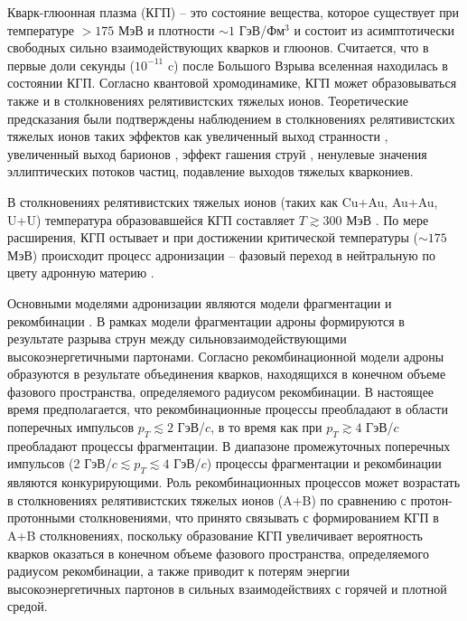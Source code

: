 {\actuality} Кварк-глюонная плазма (КГП) -- это состояние вещества, которое существует при температуре $>175$ МэВ и плотности $\sim1$ ГэВ/Фм$^3$ \autocite{firstQGP, firstQGPcern, QGP} и состоит из асимптотически свободных сильно взаимодействующих кварков и глюонов. Считается, что в первые доли секунды ($10^{-11}$ c) после Большого Взрыва вселенная находилась в состоянии КГП. Согласно квантовой хромодинамике, КГП может образовываться также и в столкновениях релятивистских тяжелых ионов. Теоретические предсказания \autocite{firstQGP} были подтверждены наблюдением в столкновениях релятивистских тяжелых ионов таких эффектов как увеличенный выход странности \autocite{StrangEnh, Strangeness_QGP}, увеличенный выход барионов \autocite{BaryonPuzzleHeavy,p2piRatio_2003,p2piRatio_130GeV}, эффект гашения струй \autocite{JetQuenching1, JetQuenching2, JetQuenching3}, ненулевые значения эллиптических потоков частиц, подавление выходов тяжелых кваркониев. 


В столкновениях релятивистских тяжелых ионов (таких как Cu+Au, Au+Au, U+U) температура образовавшейся КГП составляет $T\gtrsim300$ МэВ \autocite{Coalescence_models}. По мере расширения, КГП остывает и при достижении критической температуры ($\sim175$ МэВ) происходит процесс адронизации \cite{QGP, QGP, Coalescence_models} -- фазовый переход в нейтральную по цвету адронную материю \autocite{nucleus2020}. 

Основными моделями адронизации являются модели фрагментации \cite{FragmentationLund} и рекомбинации \autocite{Coalescence_models, Recombination1, Recombination2}. В рамках модели фрагментации адроны формируются в результате разры­ва струн между сильновзаимодействующими высокоэнергетичными партонами.
Согласно рекомбинационной модели адроны образуются в результате объединения кварков, находящихся в конечном объеме фазового пространства, определяемого радиусом рекомбинации. 
В настоящее время предполагается, что рекомбинационные процессы преобладают в области поперечных импульсов $p_T \lesssim 2$ ГэВ/$c$, в то время как при $p_T \gtrsim 4$ ГэВ/$c$ преобладают
процессы фрагментации. В диапазоне промежуточных поперечных импульсов (2 ГэВ/$c \lesssim p_T \lesssim 4$ ГэВ/$c$) процессы фрагментации и рекомбинации являют­ся конкурирующими.
Роль рекомбинационных процессов может возрастать в столкновениях релятивистских тяжелых ионов (A+B) по сравнению с протон-протонными столкновениями, что принято связывать \cite{Recombination1, Recombination2, BaryonPuzzleHeavy} с формированием КГП в A+B столкновениях, поскольку
образование КГП увеличивает вероятность кварков оказаться в конечном объеме фазового пространства, определяемого радиусом рекомбинации, а также приводит к потерям энергии высокоэнергетичных партонов в сильных взаимодействиях с горячей и плотной средой.


